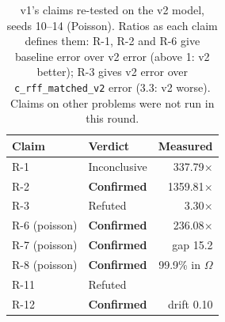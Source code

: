 \begin{table}[htbp]
  \centering
  \small
  \begin{tabular}{llr}
  \toprule
  Claim & Verdict & Measured \\
  \midrule
  R-1 & Inconclusive & 337.79$\times$ \\
  R-2 & \textbf{Confirmed} & 1359.81$\times$ \\
  R-3 & Refuted & 3.30$\times$ \\
  R-6 (poisson) & \textbf{Confirmed} & 236.08$\times$ \\
  R-7 (poisson) & \textbf{Confirmed} & gap 15.2 \\
  R-8 (poisson) & \textbf{Confirmed} & 99.9\% in $\Omega$ \\
  R-11 & Refuted &  \\
  R-12 & \textbf{Confirmed} & drift 0.10 \\
  \bottomrule
  \end{tabular}
  \caption{v1's claims re-tested on the v2 model, seeds 10--14 (Poisson). Ratios as each
    claim defines them: R-1, R-2 and R-6 give baseline error over v2 error (above 1: v2 better);
    R-3 gives v2 error over \texttt{c\_rff\_matched\_v2} error (3.3: v2 worse). Claims on other
    problems were not run in this round.}
  \label{tab:v2}
\end{table}
